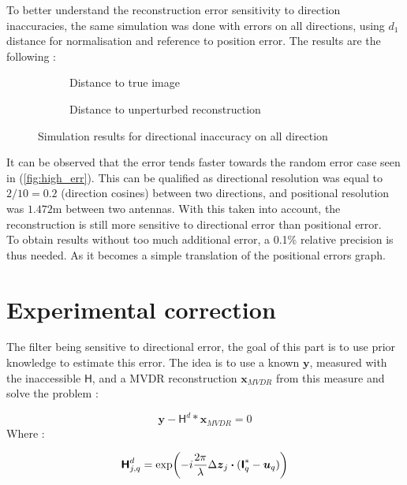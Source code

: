 \documentclass[titlepage,11pt]{article}
\renewcommand{\H}{\boldsymbol{\mathsf{H}}}
\newcommand{\I}{\boldsymbol{\mathsf{I}}}
\newcommand{\x}{\boldsymbol{x}}
\newcommand{\y}{\boldsymbol{y}}
\newcommand{\z}{\boldsymbol{z}}
\renewcommand{\u}{\boldsymbol{u}}
\begin{document}
	To better understand the reconstruction error sensitivity to direction inaccuracies, the same simulation was done with errors on all directions, using $d_1$ distance for normalisation and reference to position error. The results are the following :
	
	\begin{figure}[H]
		\centering
		\begin{subfigure}{.5\textwidth}
			\centering
			
			\caption{Distance to true image}
		\end{subfigure}%
		\begin{subfigure}{.5\textwidth}
			\centering
			
			\caption{Distance to unperturbed reconstruction}
		\end{subfigure}
		\caption{Simulation results for directional inaccuracy on all direction}
	\end{figure}

	It can be observed that the error tends faster towards the random error case seen in (\ref{fig:high_err}). This can be qualified as directional resolution was equal to $2/10=0.2$ (direction cosines) between two directions, and positional resolution was $1.472$m between two  antennas. With this taken into account, the reconstruction is still more sensitive to directional error than positional error. \\
	
	To obtain results without too much additional error, a 0.1\% relative precision is thus needed. As it becomes a simple translation of the positional errors graph.
	
	\newpage
	\part{Experimental correction}
	
	The filter being sensitive to directional error, the goal of this part is to use prior knowledge to estimate this error. The idea is to use a known $\y$, measured with the inaccessible $\H$, and a MVDR reconstruction $\x_{MVDR}$ \cite{TER} from this measure and solve the problem :

	
	$$
		\y - \H^d*\x_{MVDR} = 0
	$$
	Where :
	
	$$
		\H_{j,q}^d = \exp(-i\frac{2\pi}{\lambda}\Delta\z_j\dotproduct(\I_q^* - \u_q))
	$$
	
\end{document}
